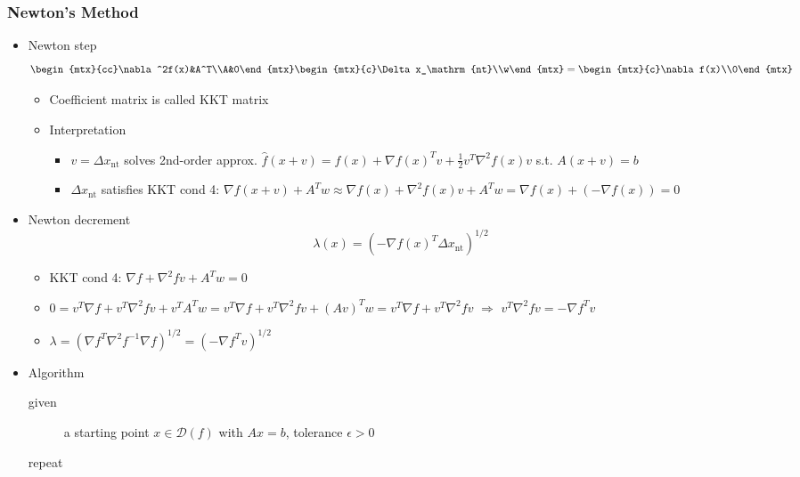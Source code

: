 \subsubsection*{Newton's Method}
\begin{itemize}
    \item Newton step
        $$ \begin{mtx}{cc}\nabla^2f(x)&A^T\\A&0\end{mtx}\begin{mtx}{c}\Delta x_\mathrm{nt}\\w\end{mtx}=\begin{mtx}{c}\nabla f(x)\\0\end{mtx} $$
    \begin{itemize}
        \item Coefficient matrix is called KKT matrix
        \item Interpretation
        \begin{itemize}
            \item $v=\Delta x_\mathrm{nt}$ solves 2nd-order approx. $\hat{f}(x+v)=f(x)+\nabla f(x)^Tv+\frac{1}{2}v^T\nabla^2 f(x)v$ s.t. $A(x+v)=b$
            \item $\Delta x_\mathrm{nt}$ satisfies KKT cond 4: $\nabla f(x+v)+A^Tw\approx\nabla f(x)+\nabla^2 f(x)v+A^Tw=\nabla f(x)+(-\nabla f(x))=0$
        \end{itemize}
    \end{itemize}
    \item Newton decrement
        $$ \lambda(x)=\left(-\nabla f(x)^T\Delta x_\mathrm{nt}\right)^{1/2} $$
    \begin{itemize}
        \item KKT cond 4: $\nabla f+\nabla^2fv+A^Tw=0$
        \item $0=v^T\nabla f+v^T\nabla^2fv+v^TA^Tw=v^T\nabla f+v^T\nabla^2fv+(Av)^Tw=v^T\nabla f+v^T\nabla^2fv$ $\Rightarrow$ $v^T\nabla^2fv=-\nabla f^Tv$
        \item $\lambda=\left(\nabla f^T\nabla^2f^{-1}\nabla f\right)^{1/2}=\left(-\nabla f^Tv\right)^{1/2}$
    \end{itemize}
    \newpage
    \item Algorithm
    \begin{description}
        \item[given] a starting point $x\in\mathcal{D}(f)$ with $Ax=b$, tolerance $\epsilon>0$
        \item[repeat] \phantom{}

\end{description}
\end{itemize}
